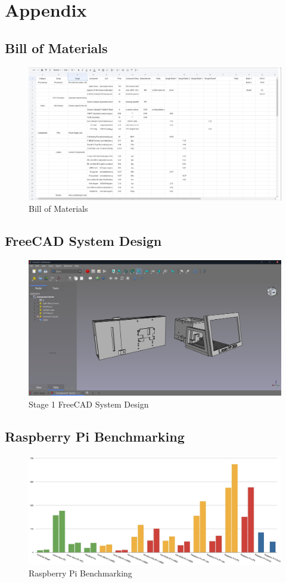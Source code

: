 \newpage
\onecolumn
\section{Appendix}
\subsection*{Bill of Materials}
\begin{figure}[H]
  \centering
  \includegraphics[width=\textwidth]{imgs/appendix/bom.jpg}
  \caption{Bill of Materials}
  \label{app:bom}
\end{figure}
\subsection*{FreeCAD System Design} 
\begin{figure}[H]
  \centering
  \includegraphics[width=\textwidth]{imgs/appendix/systemdesign.jpg}
  \caption{Stage 1 FreeCAD System Design}
  \label{app:freecad}
\end{figure}

\subsection*{Raspberry Pi Benchmarking}
\begin{figure}[H]
  \centering
  \includegraphics[width=\textwidth]{imgs/articles/benchmarks.png}
  \caption{Raspberry Pi Benchmarking}
  \label{app:benchmarking}
\end{figure}